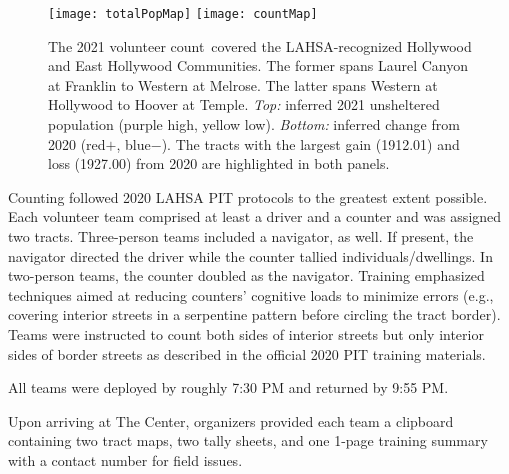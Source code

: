 \documentclass[11pt,twocolumn]{article}
\def\Count{count}
\begin{document}
\begin{figure}[t!]
	\centering
	\texttt{[image: totalPopMap]}
	\texttt{[image: countMap]}
	\caption{The 2021 volunteer \Count\ covered the LAHSA-recognized Hollywood and East 
			Hollywood Communities. The former spans Laurel Canyon at Franklin to Western
			at Melrose. The latter spans Western at Hollywood to Hoover at Temple. 
			{\it Top:} inferred 2021 unsheltered population (purple high, yellow low). 
			{\it Bottom:} inferred change from 2020 (red$+$, blue$-$). The tracts with the 
			largest gain (1912.01) and loss (1927.00) from 2020 are highlighted
			in both panels.}
	\label{fig:map}	
\end{figure}

Counting followed 2020 LAHSA PIT protocols to the greatest extent possible. Each volunteer team 
comprised at least a driver and a counter and was assigned two tracts. Three-person teams 
included a navigator, as well. If present, the navigator directed the driver while the counter tallied 
individuals/dwellings. In two-person teams, the counter doubled as the navigator. Training 
emphasized techniques aimed at reducing counters' cognitive loads to minimize errors (e.g., 
covering interior streets in a serpentine pattern before circling the tract border). Teams were 
instructed to count both sides of interior streets but only interior sides of border streets 
as described in the official 2020 PIT training materials.

All teams were deployed by roughly 7:30 PM and returned by 9:55 PM.

Upon arriving at The Center, organizers provided each team a clipboard containing two tract maps,
two tally sheets, and one 1-page training summary with a contact number for field issues.
\end{document}
